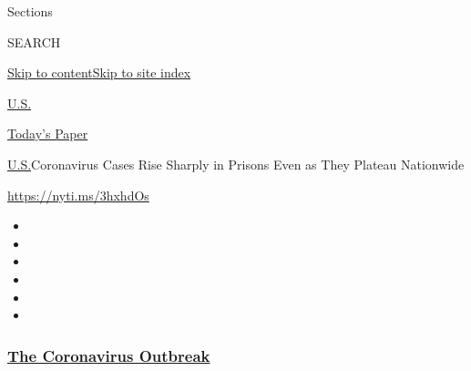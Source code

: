 Sections

SEARCH

\protect\hyperlink{site-content}{Skip to
content}\protect\hyperlink{site-index}{Skip to site index}

\href{https://www.nytimes3xbfgragh.onion/section/us}{U.S.}

\href{https://myaccount.nytimes3xbfgragh.onion/auth/login?response_type=cookie\&client_id=vi}{}

\href{https://www.nytimes3xbfgragh.onion/section/todayspaper}{Today's
Paper}

\href{/section/us}{U.S.}\textbar{}Coronavirus Cases Rise Sharply in
Prisons Even as They Plateau Nationwide

\url{https://nyti.ms/3hxhdOs}

\begin{itemize}
\item
\item
\item
\item
\item
\item
\end{itemize}

\hypertarget{the-coronavirus-outbreak}{%
\subsubsection{\texorpdfstring{\href{https://www.nytimes3xbfgragh.onion/news-event/coronavirus?name=styln-coronavirus-national\&region=TOP_BANNER\&block=storyline_menu_recirc\&action=click\&pgtype=Article\&impression_id=088a7ed0-f4ba-11ea-8fe6-a15add8e2357\&variant=undefined}{The
Coronavirus
Outbreak}}{The Coronavirus Outbreak}}\label{the-coronavirus-outbreak}}

